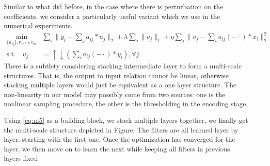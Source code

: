 Similar to what did before, in the case where there is perturbation on the coefficients, we consider a particularly useful variant which we use in the numerical experiments.
\begin{equation}
\label{eq:m5}
\begin{aligned}
	\min_{\{a_{ij}\}, v_1,\cdots,v_m}& \sum_i \|y_i - \sum_j a_{ij}*u_j\|_2 +\lambda \sum_j \|v_j\|_1 + \eta \sum_j \|v_j-  \sum_{i} a_{ij}(-\cdot)*x_i \|_2^2\\
	 \textrm{s.t.}  	\quad 	u_j&=\uparrow\downarrow(\sum_i a_{ij}(-\cdot)*y_i), \forall j.
	\end{aligned}
\end{equation}
There is a subtlety considering stacking intermediate layer to form a multi-scale structures. That is, the output to input relation cannot be linear, otherwise stacking multiple layers would just be equivalent as a one layer structure. The non-linearity in our model may possibly come from two sources: one is the nonlinear sampling procedure, the other is the thresholding in the encoding stage.

Using \eqref{eq:m5} as a building block, we stack multiple layers together, we finally get the multi-scale structure depicted in Figure. The filters are all learned layer by layer, starting with the first one. Once the optimization has converged for the layer, we then move on to learn the next while keeping all filters in previous layers fixed.

